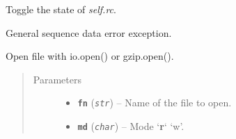 \documentclass[letterpaper,10pt,english]{sphinxmanual}
\begin{document}
\begin{fulllineitems}
\begin{fulllineitems}
\begin{quote}
\begin{description}
\end{description}\end{quote}

\end{fulllineitems}


\begin{fulllineitems}
\label{seqbase:libPoMo.seqbase.Seq.toggle_rc}
Toggle the state of \emph{self.rc}.

\end{fulllineitems}


\end{fulllineitems}


\begin{fulllineitems}
\label{seqbase:libPoMo.seqbase.SequenceDataError}
General sequence data error exception.

\end{fulllineitems}


\begin{fulllineitems}
\label{seqbase:libPoMo.seqbase.gz_open}
Open file with io.open() or gzip.open().
\begin{quote}\begin{description}
\item[{Parameters}] \leavevmode\begin{itemize}
\item {} 
\textbf{\texttt{fn}} (\emph{\texttt{str}}) -- Name of the file to open.

\item {} 
\textbf{\texttt{md}} (\emph{\texttt{char}}) -- Mode `\textbf{r}` \textbar{} `w'.

\end{itemize}

\end{description}\end{quote}

\end{fulllineitems}

\end{document}
